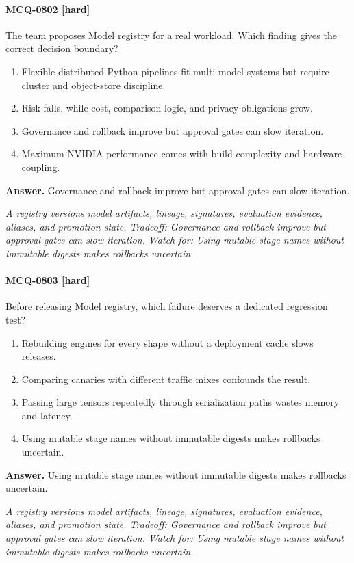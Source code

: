 \paragraph{MCQ-0802 [hard]} The team proposes Model registry for a real workload. Which finding gives the correct decision boundary?
\begin{enumerate}[label=\Alph*.]
\item Flexible distributed Python pipelines fit multi-model systems but require cluster and object-store discipline.
\item Risk falls, while cost, comparison logic, and privacy obligations grow.
\item Governance and rollback improve but approval gates can slow iteration.
\item Maximum NVIDIA performance comes with build complexity and hardware coupling.
\end{enumerate}
\noindent\textbf{Answer.} Governance and rollback improve but approval gates can slow iteration.
\par\textit{A registry versions model artifacts, lineage, signatures, evaluation evidence, aliases, and promotion state. Tradeoff: Governance and rollback improve but approval gates can slow iteration. Watch for: Using mutable stage names without immutable digests makes rollbacks uncertain.}
\paragraph{MCQ-0803 [hard]} Before releasing Model registry, which failure deserves a dedicated regression test?
\begin{enumerate}[label=\Alph*.]
\item Rebuilding engines for every shape without a deployment cache slows releases.
\item Comparing canaries with different traffic mixes confounds the result.
\item Passing large tensors repeatedly through serialization paths wastes memory and latency.
\item Using mutable stage names without immutable digests makes rollbacks uncertain.
\end{enumerate}
\noindent\textbf{Answer.} Using mutable stage names without immutable digests makes rollbacks uncertain.
\par\textit{A registry versions model artifacts, lineage, signatures, evaluation evidence, aliases, and promotion state. Tradeoff: Governance and rollback improve but approval gates can slow iteration. Watch for: Using mutable stage names without immutable digests makes rollbacks uncertain.}
